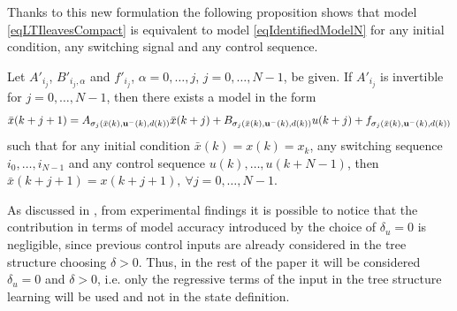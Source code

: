 Thanks to this new formulation the following proposition shows that model \eqref{eqLTIleavesCompact} is equivalent to model \eqref{eqIdentifiedModelN} for any initial condition, any switching signal and any control sequence.
\begin{proposition}\label{propSwitchingSystem}\cite{smarraNAHS2020}
	Let $A'_{i_j}$, $B'_{i_j,\alpha}$ and $f'_{i_j}$, $\alpha=0,\ldots,j$, $j=0,\ldots,N-1$, be given. If $A'_{i_j}$ is invertible for $j=0,\ldots,N-1$, then there exists a model in the form
	\vspace{-0.2cm}
	\small
	\begin{equation*}
	\bar x({k+j+1}) = A_{\sigma_j(\bar x(k),\bold{u^-}(k), d(k))} \bar x({k+j})+B_{\sigma_j(\bar x(k),\bold{u^-}(k), d(k))} u({k+j})+ f_{\sigma_j(\bar x(k),\bold{u^-}(k), d(k))}	
	\end{equation*}
	\normalsize
	such that for any initial condition $\bar x(k) = x(k) = x_k$, any switching sequence $i_0, \ldots, i_{N-1}$ and any control sequence $u(k),\ldots,u(k+N-1)$, then $\bar x(k+j+1) = x(k+j+1),\ \forall j=0,\ldots,N-1$.
\end{proposition}

As discussed in \cite{smarraNAHS2020}, from experimental findings it is possible to notice that the contribution in terms of model accuracy introduced by the choice of $\delta_u = 0$ is negligible, since previous control inputs are already considered in the tree structure choosing $\delta > 0$. Thus, in the rest of the paper it will be considered $\delta_u = 0$ and $\delta > 0$, i.e. only the regressive terms of the input in the tree structure learning will be used and not in the state definition.

